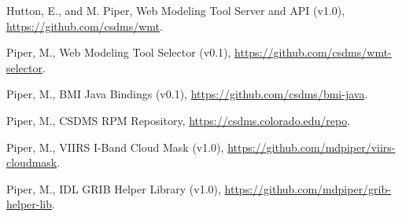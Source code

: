 \begin{enumerate}[{[}1{]}]
  \item Hutton, E., and M. Piper, Web Modeling Tool Server and API (v1.0),
    \url{https://github.com/csdms/wmt}.

  \item Piper, M., Web Modeling Tool Selector (v0.1),
    \url{https://github.com/csdms/wmt-selector}.

  \item Piper, M., BMI Java Bindings (v0.1),
    \url{https://github.com/csdms/bmi-java}.

  \item Piper, M., CSDMS RPM Repository,
    \url{https://csdms.colorado.edu/repo}.

  \item Piper, M., VIIRS I-Band Cloud Mask (v1.0),
    \url{https://github.com/mdpiper/viirs-cloudmask}.

  \item Piper, M., IDL GRIB Helper Library (v1.0),
    \url{https://github.com/mdpiper/grib-helper-lib}.

\end{enumerate}
